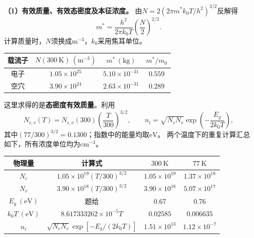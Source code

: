 \begin{problem}
    \textbf{（1）有效质量、有效态密度及本征浓度。}
    由$N=2(2\pi m^*k_0T/h^2)^{3/2}$反解得
    \[
    m^*=\frac{h^2}{2\pi k_0T}\left(\frac{N}{2}\right)^{2/3}.
    \]
    计算质量时，$N$须换成$\mathrm{m}^{-3}$，$k_0$采用焦耳单位。
    \begin{center}
        \begin{tabular}{c c c c}
            \hline
            载流子 & $N(300\ \mathrm{K})\ (\mathrm{m}^{-3})$ & $m^*\ (\mathrm{kg})$ & $m^*/m_0$ \\
            \hline
            电子 & $1.05\times10^{25}$ & $5.10\times10^{-31}$ & $0.559$ \\
            空穴 & $3.90\times10^{24}$ & $2.63\times10^{-31}$ & $0.289$ \\
            \hline
        \end{tabular}
    \end{center}
    这里求得的是\textbf{态密度有效质量}。利用
    \[
    N_{c,v}(T)=N_{c,v}(300)\left(\frac{T}{300}\right)^{3/2},
    \qquad
    n_i=\sqrt{N_cN_v}\exp\!\left(-\frac{E_g}{2k_0T}\right),
    \]
    其中$(77/300)^{3/2}=0.1300$；指数中的能量均取$\mathrm{eV}$。
    两个温度下的重复计算汇总如下，所有浓度单位均为$\mathrm{cm}^{-3}$。
    \begin{center}
        \begin{tabular}{c c c c}
            \hline
            物理量 & 计算式 & $300\ \mathrm{K}$ & $77\ \mathrm{K}$ \\
            \hline
            $N_c$ & $1.05\times10^{19}(T/300)^{3/2}$ & $1.05\times10^{19}$ & $1.37\times10^{18}$ \\
            $N_v$ & $3.90\times10^{18}(T/300)^{3/2}$ & $3.90\times10^{18}$ & $5.07\times10^{17}$ \\
            $E_g\ (\mathrm{eV})$ & 题给 & $0.67$ & $0.76$ \\
            $k_0T\ (\mathrm{eV})$ & $8.617333262\times10^{-5}T$ & $0.02585$ & $0.006635$ \\
            $n_i$ & $\sqrt{N_cN_v}\exp[-E_g/(2k_0T)]$ & $1.51\times10^{13}$ & $1.12\times10^{-7}$ \\
            \hline
        \end{tabular}
    \end{center}


\end{problem}
